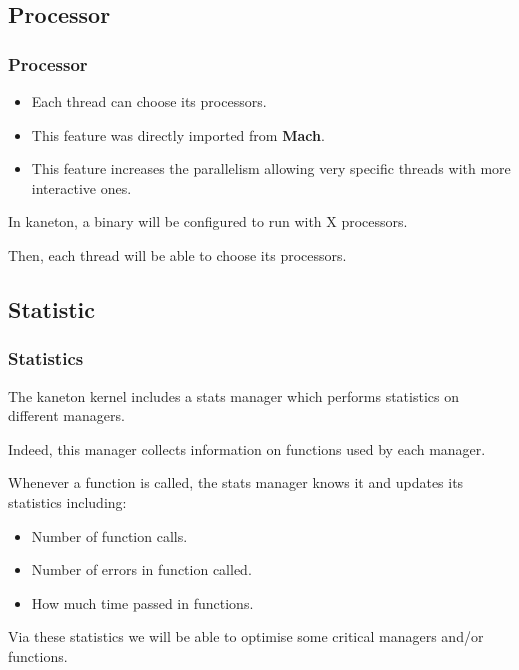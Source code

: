 %
%

\subsection{Processor}


\begin{frame}
  \frametitle{Processor}

  \begin{itemize}
    \item
      Each thread can choose its processors.
    \item
      This feature was directly imported from \textbf{Mach}.
    \item
      This feature increases the parallelism allowing very
      specific threads with more interactive ones.
  \end{itemize}

  \-

  In kaneton, a binary will be configured to run with X processors.

  \-

  Then, each thread will be able to choose its processors.
\end{frame}

%
%

\subsection{Statistic}


\begin{frame}
  \frametitle{Statistics}

  The kaneton kernel includes a stats manager which performs statistics
  on different managers.

  \-

  Indeed, this manager collects information on functions used by each
  manager.

  \-

  Whenever a function is called, the stats manager knows it and updates
  its statistics including:

  \begin{itemize}[<+->]
    \item
      Number of function calls.
    \item
      Number of errors in function called.
    \item
      How much time passed in functions.
  \end{itemize}

  \-

  Via these statistics we will be able to optimise some critical managers
  and/or functions.
\end{frame}

